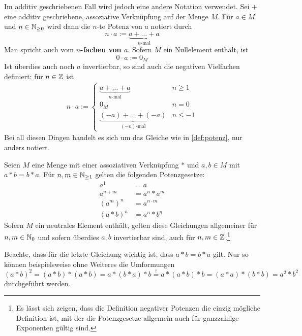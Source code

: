     
\begin{nota}
    Im additiv geschriebenen Fall wird jedoch eine andere Notation verwendet. Sei $+$ eine additiv geschriebene, assoziative Verknüpfung auf der Menge $M$. Für $a\in M$ und $n\in \mathbb N_{\ge 0}$ wird dann die $n$-te Potenz von $a$ notiert durch
        \[ n \cdot a := \underbrace{a + \ldots + a}_{n\text{-mal}} \]
    Man spricht auch vom \textbf{$n$-fachen von $a$}. Sofern $M$ ein Nullelement enthält, ist
        \[ 0\cdot a := 0_M \]
    Ist überdies auch noch $a$ invertierbar, so sind auch die negativen Vielfachen definiert: für $n\in \mathbb Z$ ist
    \begin{align*}
        n \cdot a := \begin{cases}
            \underbrace{a+ \ldots + a}_{n\text{-mal}} & n \ge 1 \\
            0_M & n= 0 \\
            \underbrace{(-a) + \ldots +  (-a)}_{(-n)\text{-mal}} & n \le -1
        \end{cases}
    \end{align*}
    Bei all diesen Dingen handelt es sich um das Gleiche wie in \cref{def:potenz}, nur anders notiert.
\end{nota}


\begin{satz}[* Potenzgesetze] \label{potenzgesetze}
    Seien $M$ eine Menge mit einer assoziativen Verknüpfung $*$ und $a,b\in M$ mit $a*b=b*a$. Für $n,m\in \mathbb N_{\ge 1}$ gelten die folgenden Potenzgesetze:
    \begin{align*}
        a^1 & = a \\
        a^{n+m} & = a^n* a^m \\
        (a^m)^n & = a^{n\cdot m} \\
        (a*b)^n &= a^n*b^n
    \end{align*}
    Sofern $M$ ein neutrales Element enthält, gelten diese Gleichungen allgemeiner für $n,m\in \mathbb N_0$ und sofern überdies $a,b$ invertierbar sind, auch für $n,m\in \mathbb Z$.\footnote{Es lässt sich zeigen, dass die Definition negativer Potenzen die einzig mögliche Definition ist, mit der die Potenzgesetze allgemein auch für ganzzahlige Exponenten gültig sind.}
\end{satz}


\noindent Beachte, dass für die letzte Gleichung wichtig ist, dass $a*b=b*a$ gilt. Nur so können beispielsweise ohne Weiteres die Umformungen
    \[ (a*b)^2 = (a*b)*(a*b) = a*(b*a)*b \overset{!}{=} a*(a*b)*b = (a*a)*(b*b) = a^2*b^2 \] 
durchgeführt werden.

